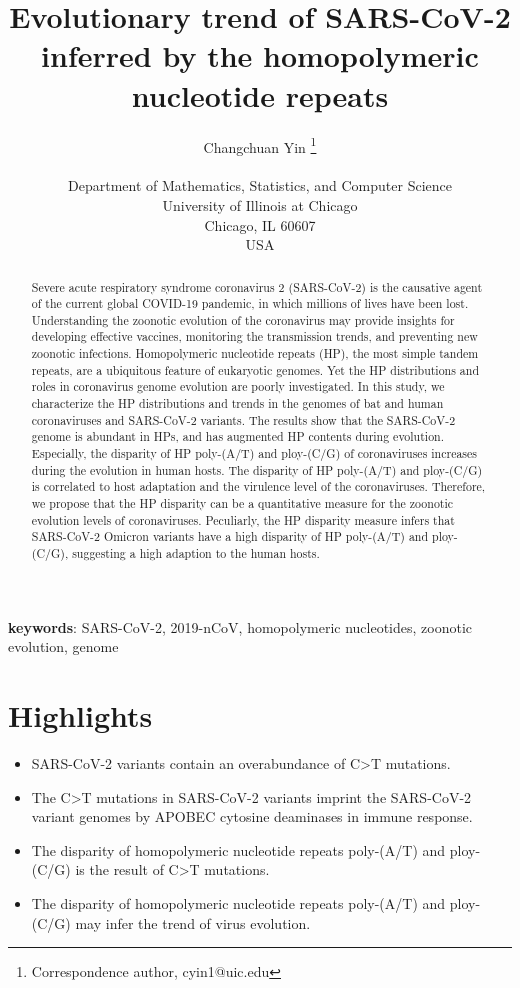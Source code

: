 \documentclass{article}
\title{Evolutionary trend of SARS-CoV-2 inferred by the homopolymeric nucleotide repeats}
\author{%
	Changchuan Yin \orcidA \thanks{Correspondence author, cyin1@uic.edu} \\\\
	Department of Mathematics, Statistics, and Computer Science \\
	University of Illinois at Chicago \\
	Chicago, IL 60607 \\
	USA \\
}
\numberwithin{equation}{section}
\begin{document}
\maketitle
\begin{abstract}
Severe acute respiratory syndrome coronavirus 2 (SARS-CoV-2) is the causative agent of the current global COVID-19 pandemic, in which millions of lives have been lost. Understanding the zoonotic evolution of the coronavirus may provide insights for developing effective vaccines, monitoring the transmission trends, and preventing new zoonotic infections. Homopolymeric nucleotide repeats (HP), the most simple tandem repeats, are a ubiquitous feature of eukaryotic genomes. Yet the HP distributions and roles in coronavirus genome evolution are poorly investigated. In this study, we characterize the HP distributions and trends in the genomes of bat and human coronaviruses and SARS-CoV-2 variants. The results show that the SARS-CoV-2 genome is abundant in HPs, and has augmented HP contents during evolution. Especially, the disparity of HP poly-(A/T) and ploy-(C/G) of coronaviruses increases during the evolution in human hosts. The disparity of HP poly-(A/T) and ploy-(C/G) is correlated to host adaptation and the virulence level of the coronaviruses. Therefore, we propose that the HP disparity can be a quantitative measure for the zoonotic evolution levels of coronaviruses. Peculiarly, the HP disparity measure infers that SARS-CoV-2 Omicron variants have a high disparity of HP poly-(A/T) and ploy-(C/G), suggesting a high adaption to the human hosts.
\end{abstract}
\textbf{{\large keywords}}: SARS-CoV-2, 2019-nCoV, homopolymeric nucleotides, zoonotic evolution, genome

\section*{Highlights}
\begin{itemize}
	\item SARS-CoV-2 variants contain an overabundance of C>T mutations.
	\item The C>T mutations in SARS-CoV-2 variants imprint the SARS-CoV-2 variant genomes by APOBEC cytosine deaminases in immune response.
	\item The disparity of homopolymeric nucleotide repeats poly-(A/T) and ploy-(C/G) is the result of C>T mutations.
	\item The disparity of homopolymeric nucleotide repeats poly-(A/T) and ploy-(C/G) may infer the trend of virus evolution.  
\end{itemize}
\end{document}
